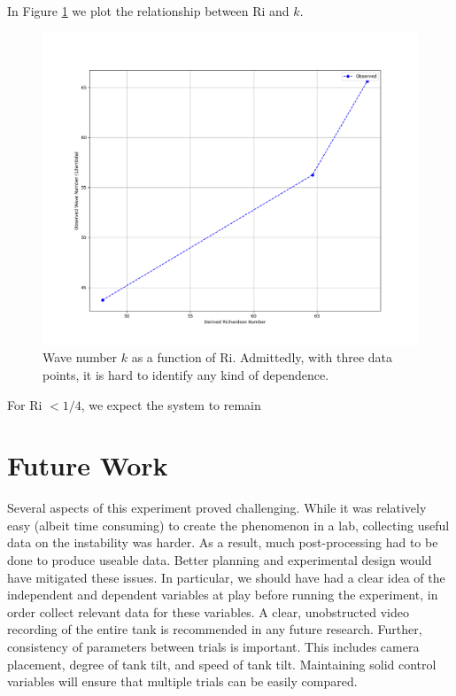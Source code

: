 \documentclass{article}
\begin{document}
In Figure \ref{graph:Ri-vs-k} we plot the relationship between Ri and \(k\).

\begin{figure}[h!]
    \centering
    \includegraphics[width=5in]{RivsK.png}
    \caption{Wave number $k$ as a function of Ri. Admittedly, with three data points, it is hard to identify any kind of dependence.}
    \label{graph:Ri-vs-k}
\end{figure}

For Ri \(< 1/4\), we expect the system to remain 

\section{Future Work}

Several aspects of this experiment proved challenging. While it was relatively
easy (albeit time consuming) to create the phenomenon in a lab, collecting
useful data on the instability was harder. As a result, much post-processing had
to be done to produce useable data. Better planning and experimental design
would have mitigated these issues. In particular, we should have had a clear
idea of the independent and dependent variables at play before running the
experiment, in order collect relevant data for these variables. A clear,
unobstructed video recording of the entire tank is recommended in any future
research. Further, consistency of parameters between trials is important. This
includes camera placement, degree of tank tilt, and speed of tank tilt.
Maintaining solid control variables will ensure that multiple trials can be
easily compared.
\end{document}
